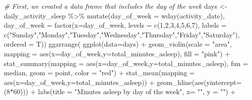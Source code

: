 \documentclass[
]{article}
\newenvironment{Shaded}{\begin{snugshade}}{\end{snugshade}}
\newcommand{\AttributeTok}[1]{\textcolor[rgb]{0.77,0.63,0.00}{#1}}
\newcommand{\CommentTok}[1]{\textcolor[rgb]{0.56,0.35,0.01}{\textit{#1}}}
\newcommand{\DecValTok}[1]{\textcolor[rgb]{0.00,0.00,0.81}{#1}}
\newcommand{\FunctionTok}[1]{\textcolor[rgb]{0.00,0.00,0.00}{#1}}
\newcommand{\NormalTok}[1]{#1}
\newcommand{\OtherTok}[1]{\textcolor[rgb]{0.56,0.35,0.01}{#1}}
\newcommand{\SpecialCharTok}[1]{\textcolor[rgb]{0.00,0.00,0.00}{#1}}
\newcommand{\StringTok}[1]{\textcolor[rgb]{0.31,0.60,0.02}{#1}}
\begin{document}
\begin{Shaded}
\begin{Highlighting}[]
\CommentTok{\# First, we created a data frame that includes the day of the week}
\NormalTok{days }\OtherTok{\textless{}{-}}\NormalTok{ daily\_activity\_sleep }\SpecialCharTok{\%\textgreater{}\%}
  \FunctionTok{mutate}\NormalTok{(}\AttributeTok{day\_of\_week =} \FunctionTok{wday}\NormalTok{(activity\_date),}
         \AttributeTok{day\_of\_week =} \FunctionTok{factor}\NormalTok{(}\AttributeTok{x=}\NormalTok{day\_of\_week, }
                              \AttributeTok{levels =} \FunctionTok{c}\NormalTok{(}\DecValTok{1}\NormalTok{,}\DecValTok{2}\NormalTok{,}\DecValTok{3}\NormalTok{,}\DecValTok{4}\NormalTok{,}\DecValTok{5}\NormalTok{,}\DecValTok{6}\NormalTok{,}\DecValTok{7}\NormalTok{), }
                              \AttributeTok{labels =} \FunctionTok{c}\NormalTok{(}\StringTok{"Sunday"}\NormalTok{,}\StringTok{"Monday"}\NormalTok{,}\StringTok{"Tuesday"}\NormalTok{,}\StringTok{"Wednesday"}\NormalTok{,}\StringTok{"Thursday"}\NormalTok{,}\StringTok{"Friday"}\NormalTok{,}\StringTok{"Saturday"}\NormalTok{),}
                              \AttributeTok{ordered =}\NormalTok{ T))}
\FunctionTok{ggarrange}\NormalTok{(}
  \FunctionTok{ggplot}\NormalTok{(}\AttributeTok{data=}\NormalTok{days) }\SpecialCharTok{+}
    \FunctionTok{geom\_violin}\NormalTok{(}\AttributeTok{scale =} \StringTok{"area"}\NormalTok{, }\AttributeTok{mapping =} \FunctionTok{aes}\NormalTok{(}\AttributeTok{x=}\NormalTok{day\_of\_week,}\AttributeTok{y=}\NormalTok{total\_minutes\_asleep), }\AttributeTok{fill =} \StringTok{"pink"}\NormalTok{) }\SpecialCharTok{+}
    \FunctionTok{stat\_summary}\NormalTok{(}\AttributeTok{mapping =} \FunctionTok{aes}\NormalTok{(}\AttributeTok{x=}\NormalTok{day\_of\_week,}\AttributeTok{y=}\NormalTok{total\_minutes\_asleep), }\AttributeTok{fun =}\NormalTok{ median, }\AttributeTok{geom =} \StringTok{\textquotesingle{}point\textquotesingle{}}\NormalTok{, }\AttributeTok{color =} \StringTok{"red"}\NormalTok{) }\SpecialCharTok{+}
    \FunctionTok{stat\_mean}\NormalTok{(}\AttributeTok{mapping =} \FunctionTok{aes}\NormalTok{(}\AttributeTok{x=}\NormalTok{day\_of\_week,}\AttributeTok{y=}\NormalTok{total\_minutes\_asleep)) }\SpecialCharTok{+}
    \FunctionTok{geom\_hline}\NormalTok{(}\FunctionTok{aes}\NormalTok{(}\AttributeTok{yintercept=}\NormalTok{(}\DecValTok{8}\SpecialCharTok{*}\DecValTok{60}\NormalTok{))) }\SpecialCharTok{+}
    \FunctionTok{labs}\NormalTok{(}\AttributeTok{title =} \StringTok{"Minutes asleep by day of the week"}\NormalTok{, }\AttributeTok{x=} \StringTok{""}\NormalTok{, }\AttributeTok{y =} \StringTok{""}\NormalTok{) }\SpecialCharTok{+}

\end{Highlighting}
\end{Shaded}
\end{document}
